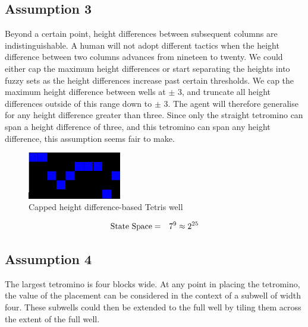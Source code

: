 \documentclass{rucsthesis}
\begin{document}
\subsection*{Assumption 3}

Beyond a certain point, height differences between subsequent columns are indistinguishable. A human will not adopt different tactics when the height difference between two columns advances from nineteen to twenty. We could either cap the maximum height differences or start separating the heights into fuzzy sets as the height differences increase past certain thresholds. We cap the maximum height difference between wells at $\pm$ 3, and truncate all height differences outside of this range down to $\pm$ 3. The agent will therefore generalise for any height difference greater than three. Since only the straight tetromino can span a height difference of three, and this tetromino can span any height difference, this assumption seems fair to make. 

\begin{figure}[h]
\centering
\includegraphics[width=1.6in]{capdiffheightwell.png}
\caption{Capped height difference-based Tetris well}
\label{fig:capdiffheightwell}
\end{figure}

\begin{eqnarray*}
\centering
\textrm{State Space} & = & 7^{9} \approx 2^{25}
\end{eqnarray*}

\subsection*{Assumption 4}

The largest tetromino is four blocks wide. At any point in placing the tetromino, the value of the placement can be considered in the context of a subwell of width four. These subwells could then be extended to the full well by tiling them across the extent of the full well.
\end{document}
